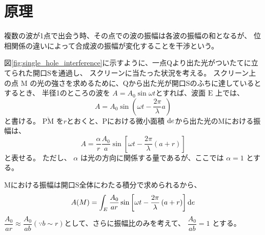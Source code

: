 \documentclass[../../../main]{subfiles}
\begin{document}
\section{原理}
複数の波が1点で出会う時、その点での波の振幅は各波の振幅の和となるが、
位相関係の違いによって合成波の振幅が変化することを干渉という。


図\ref{fig:single_hole_interference}に示すように、一点\( \mathrm{Q} \)より出た光がついたてに立てられた開口\( \mathrm{S} \)を通過し、
スクリーンに当たった状況を考える。
スクリーン上の点 \( \mathrm{M} \) の光の強さを求めるために、Qから出た光が開口Sのふちに達しているとするとき、
半径1のところの波を \( A = A_0 \sin \omega t \)とすれば、波面 \( \mathrm{E} \) 上では、
\begin{equation}
	A = A_0 \sin \left( \omega t - \dfrac{2\pi}{\lambda} a  \right)
\end{equation}
と書ける。
\( \overline{\mathrm{PM}} \) を\( r \)とおくと、Pにおける微小面積 \( \odif{e} \)から出た光のMにおける振幅は、
\begin{equation}
	A = \dfrac{\alpha}{r} \dfrac{A_0}{a} \sin \left[ \omega t - \dfrac{2\pi}{\lambda} \left( a+r \right)  \right]
\end{equation}
と表せる。
ただし、 \( \alpha \) は光の方向に関係する量であるが、ここでは \( \alpha = 1 \) とする。

Mにおける振幅は開口S全体にわたる積分で求められるから、
\begin{equation}
	A(M) = \int_{E} \dfrac{A_0}{ar} \sin  \left[ \omega t - \dfrac{2\pi}{\lambda} \left( a + r \right)  \right] \odif{e}
\end{equation}
\( \dfrac{A_0}{ar} \approx \dfrac{A_0}{ab} \left( \because b \sim r \right)  \)として、さらに振幅比のみを考えて、
\( \dfrac{A_0}{ab} = 1  \) とする。
\end{document}
